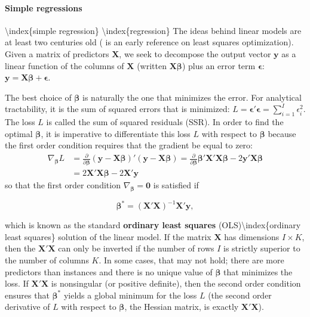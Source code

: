 \paragraph{Simple regressions}\label{penreg}

{\textbackslash}index\{simple regression\} {\textbackslash}index\{regression\}
The ideas behind linear models are at least two centuries old (\cite{legendre1805nouvelles} is an early reference on least squares optimization). Given a matrix of predictors $\textbf{X}$, we seek to decompose the output vector $\textbf{y}$ as a linear function of the columns of $\textbf{X}$ (written $\textbf{X}\boldsymbol{\beta}$) plus an error term $\boldsymbol{\epsilon}$: $\textbf{y}=\textbf{X}\boldsymbol{\beta}+\boldsymbol{\epsilon}$.

The best choice of $\boldsymbol{\beta}$ is naturally the one that minimizes the error. For analytical tractability, it is the sum of squared errors that is minimized: $L=\boldsymbol{\epsilon}'\boldsymbol{\epsilon}=\sum_{i=1}^I\epsilon_i^2$. The loss $L$ is called the sum of squared residuals (SSR). In order to find the optimal $\boldsymbol{\beta}$, it is imperative to differentiate this loss $L$ with respect to $\boldsymbol{\beta}$ because the first order condition requires that the gradient be equal to zero:
\begin{align*}
\nabla_{\boldsymbol{\beta}} L&=\frac{\partial}{\partial \boldsymbol{\beta}}(\textbf{y}-\textbf{X}\boldsymbol{\beta})'(\textbf{y}-\textbf{X}\boldsymbol{\beta})=\frac{\partial}{\partial \boldsymbol{\beta}}\boldsymbol{\beta}'\textbf{X}'\textbf{X}\boldsymbol{\beta}-2\textbf{y}'\textbf{X}\boldsymbol{\beta} \\
&=2\textbf{X}'\textbf{X}\boldsymbol{\beta}  -2\textbf{X}'\textbf{y}
\end{align*}
so that the first order condition $\nabla_{\boldsymbol{\beta}}=\textbf{0}$ is satisfied if

\begin{equation}
\label{regbeta}
\boldsymbol{\beta}^*=(\textbf{X}'\textbf{X})^{-1}\textbf{X}'\textbf{y},
\end{equation}

which is known as the standard \textbf{ordinary least squares} (OLS){\textbackslash}index\{ordinary least squares\} solution of the linear model. If the matrix $\textbf{X}$ has dimensions $I \times K$, then the $\textbf{X}'\textbf{X}$ can only be inverted if the number of rows $I$ is strictly superior to the number of columns $K$. In some cases, that may not hold; there are more predictors than instances and there is no unique value of $\boldsymbol{\beta}$ that minimizes the loss. If $\textbf{X}'\textbf{X}$ is nonsingular (or positive definite), then the second order condition ensures that $\boldsymbol{\beta}^*$ yields a global minimum for the loss $L$ (the second order derivative of $L$ with respect to $\boldsymbol{\beta}$, the Hessian matrix, is exactly $\textbf{X}'\textbf{X}$).

